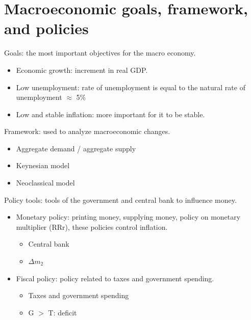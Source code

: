 \documentclass[openany]{book}
\begin{document}
\section{Macroeconomic goals, framework, and policies}
Goals: the most important objectives for the macro economy. 
\begin{itemize}
    \item Economic growth: increment in real GDP.
    \item Low unemployment: rate of unemployment is equal to the natural rate of unemployment $\approx$ 5\%
    \item Low and stable inflation: more important for it to be stable.
\end{itemize}
Framework: used to analyze macroeconomic changes. 
\begin{itemize}
    \item Aggregate demand / aggregate supply
    \item Keynesian model
    \item Neoclassical model 
\end{itemize}
Policy tools: tools of the government and central bank to influence money. 
\begin{itemize}
    \item Monetary policy: printing money, supplying money, policy on monetary multiplier (RRr), these policies control inflation. 
        \begin{itemize}
            \item Central bank 
            \item $\Delta m_2$ 
        \end{itemize}
    \item Fiscal policy: policy related to taxes and government spending.
        \begin{itemize}
            \item Taxes and government spending
            \item G $>$ T: deficit 
        \end{itemize}
\end{itemize}
\end{document}

